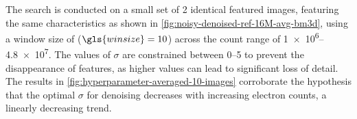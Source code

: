 The search is conducted on a small set of \num{2} identical featured  images, featuring the same characteristics as shown in \cref{fig:noisy-denoised-ref-16M-avg-bm3d}, using a window size of ($\gls{winsize} = \num{10}$) across the count range of \numrange{1e6}{4.8e7}. The values of $\sigma$ are constrained between \numrange{0}{5} to prevent the disappearance of features, as higher values can lead to significant loss of detail. The results in \cref{fig:hyperparameter-averaged-10-images} corroborate the hypothesis that the optimal $\sigma$ for denoising decreases with increasing electron counts, a linearly decreasing trend.

